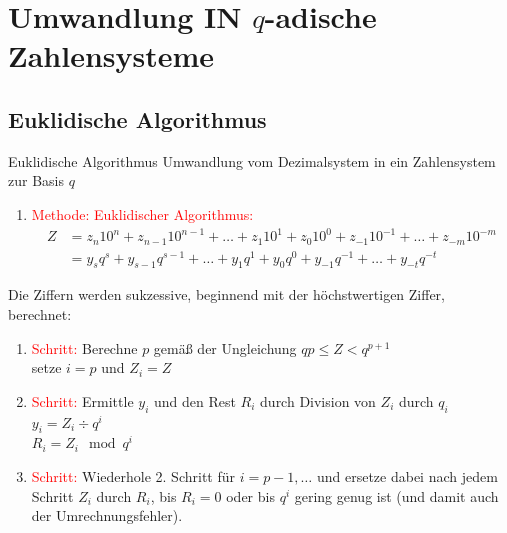 \documentclass[12pt%
,aspectratio=169%
]{beamer}
\begin{document}
\section{Umwandlung IN $q$-adische Zahlensysteme}
\subsection{Euklidische Algorithmus}
\begin{frame}{Euklidische Algorithmus}
Umwandlung vom Dezimalsystem in ein Zahlensystem zur Basis $q$
\begin{enumerate}
	\item \textcolor{red}{Methode: Euklidischer Algorithmus:}
	\begin{align*}
		Z &= z_n 10^n + z_{n-1} 10^{n-1} + \ldots + z_1 10^1 + z_0 10^0 + z_{-1} 10^{-1} + \ldots + z_{-m} 10^{-m} \\
		&= y_s q^s + y_{s-1} q^{s-1} + \ldots + y_1 q^1 + y_0 q^0 + y_{-1} q^{-1} + \ldots + y_{-t} q^{-t}
	\end{align*}
\end{enumerate}
Die Ziffern werden sukzessive, beginnend mit der höchstwertigen Ziffer, berechnet:
\begin{enumerate}
	\item \textcolor{red}{Schritt:} Berechne $p$ gemäß der Ungleichung $qp \leq Z < q^{p+1}$\\
	setze $i = p$ und $Z_i = Z$
	\item \textcolor{red}{Schritt:} Ermittle $y_i$ und den Rest $R_i$ durch Division von $Z_i$ durch $q_i$\\
	\textbf{$y_i = Z_i \div q^i$}\\
	\textbf{$R_i = Z_i \mod q^i$}
	\item \textcolor{red}{Schritt:} Wiederhole 2. Schritt für $i = p-1,\ldots$ und ersetze dabei nach jedem Schritt $Z_i$ durch $R_i$, bis $R_i = 0$ oder bis $q^i$ gering genug ist (und damit auch der Umrechnungsfehler).
\end{enumerate}
\end{frame}
\end{document}
